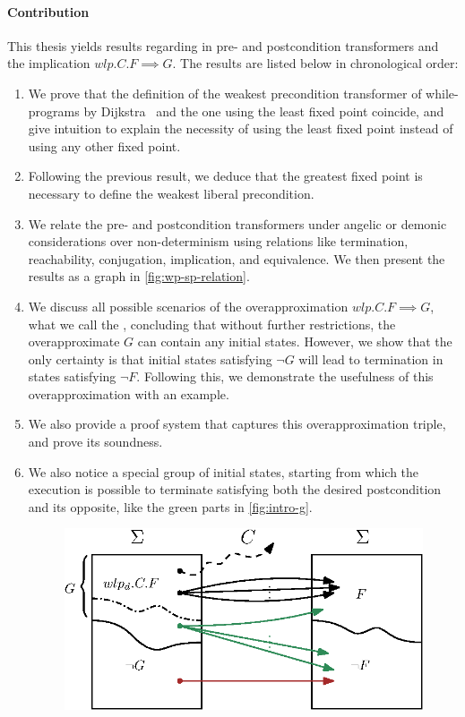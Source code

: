 \paragraph{Contribution}
This thesis yields results regarding in pre- and postcondition transformers and the implication $wlp.C.F\implies G$. 
The results are listed below in chronological order: 
\begin{enumerate}
    \item We prove that the definition of the weakest precondition transformer of while-programs by Dijkstra~\cite{dijkstra75} and the one using the least fixed point coincide, and give intuition to explain the necessity of using the least fixed point instead of using any other fixed point. 
    \item Following the previous result, we deduce that the greatest fixed point is necessary to define the weakest liberal precondition. 
    \item We relate the pre- and postcondition transformers under angelic or demonic considerations over non-determinism using relations like termination, reachability, conjugation, implication, and equivalence. 
    We then present the results as a graph in \autoref{fig:wp-sp-relation}.
    \item We discuss all possible scenarios of the overapproximation $wlp.C.F\implies G$, what we call the , concluding that without further restrictions, the overapproximate $G$ can contain any initial states. However, we show that the only certainty is that initial states satisfying $\neg G$ will lead to termination in states satisfying $\neg F$. Following this, we demonstrate the usefulness of this overapproximation with an example. 
    \item We also provide a proof system that captures this overapproximation triple, and prove its soundness. 
    \item We also notice a special group of initial states, starting from which the execution is possible to terminate satisfying both the desired postcondition and its opposite, like the green parts in \autoref{fig:intro-g}. 
    \begin{figure}[t]
        \centering
        \includegraphics[width=.6\linewidth]{image/wlp-g/wlp-g-gg.eps}

\end{figure}
\end{enumerate}
